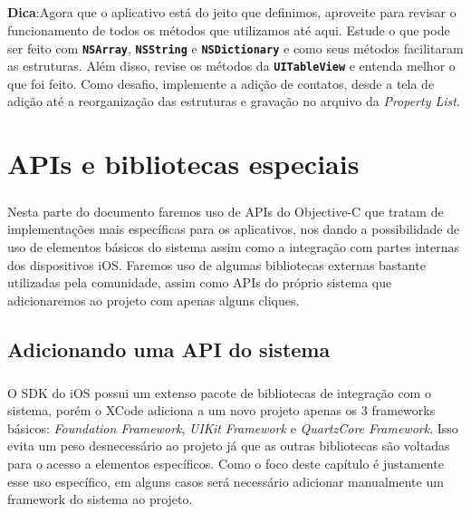 \documentclass[a4paper,12pt,brazil,doubleside]{book}
\begin{document}
\begin{singlespace}
\begin{framed}
\paragraph{}\textbf{Dica}:Agora que o aplicativo está do jeito que definimos, aproveite para revisar o funcionamento de todos os métodos que utilizamos até aqui. Estude o que pode ser feito com \texttt{\textbf{NSArray}}, \texttt{\textbf{NSString}} e \texttt{\textbf{NSDictionary}} e como seus métodos facilitaram as estruturas. Além disso, revise os métodos da \texttt{\textbf{UITableView}} e entenda melhor o que foi feito. Como desafio, implemente a adição de contatos, desde a tela de adição até a reorganização das estruturas e gravação no arquivo da \emph{Property List}.
\end{framed}

\chapter{APIs e bibliotecas especiais}

\paragraph{}Nesta parte do documento faremos uso de APIs do Objective-C que tratam de implementações mais específicas para os aplicativos, nos dando a possibilidade de uso de elementos básicos do sistema assim como a integração com partes internas dos dispositivos iOS. Faremos uso de algumas bibliotecas externas bastante utilizadas pela comunidade, assim como APIs do próprio sistema que adicionaremos ao projeto com apenas alguns cliques.

\bigskip
\bigskip


\section{Adicionando uma API do sistema}

\paragraph{}O SDK do iOS possui um extenso pacote de bibliotecas de integração com o sistema, porém o XCode adiciona a um novo projeto apenas os 3 frameworks básicos: \emph{Foundation Framework}, \emph{UIKit Framework} e \emph{QuartzCore Framework}. Isso evita um peso desnecessário ao projeto já que as outras bibliotecas são voltadas para o acesso a elementos específicos. Como o foco deste capítulo é justamente esse uso específico, em alguns casos será necessário adicionar manualmente um framework do sistema ao projeto.

\end{singlespace}
\end{document}
